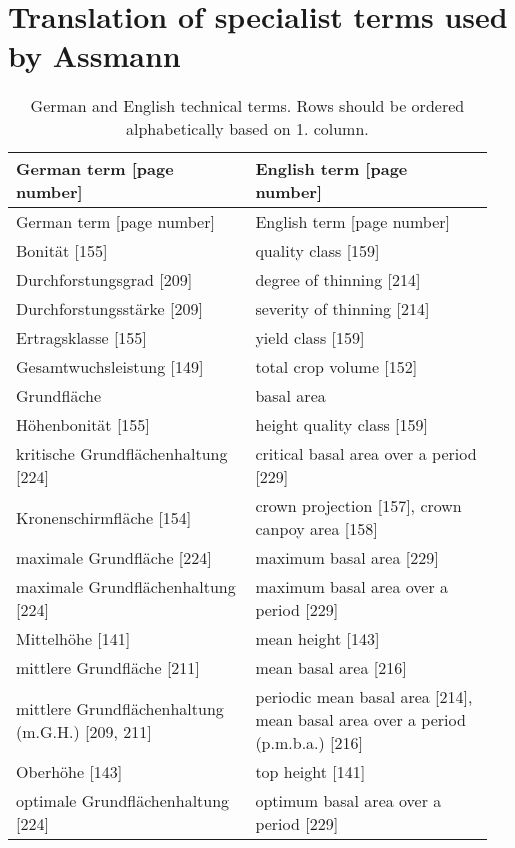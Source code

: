 \section{Translation of specialist terms used by Assmann}

\begin{singlespace}
  {\tabulinesep=2mm
    \begin{longtabu}{p{0.475\linewidth} p{0.475\linewidth}}
      \caption{German \parencite{Assmann1961} and English \parencite{Assmann1970} technical terms.  Rows should be ordered alphabetically based on 1. column.} \\
      \toprule
      German term [page number] & English term [page number] \\
      \midrule
      \endfirsthead
      German term [page number] & English term [page number] \\
      \midrule
      \endhead
      \bottomrule
      \endlastfoot
      Bonität [155] & quality class [159] \\
      Durchforstungsgrad [209] & degree of thinning [214] \\
      Durchforstungsstärke [209] & severity of thinning [214] \\
      Ertragsklasse [155] & yield class [159] \\
      Gesamtwuchsleistung [149] & total crop volume [152] \\
      Grundfläche & basal area \\
      Höhenbonität [155] & height quality class [159] \\
      kritische Grundflächenhaltung [224] & critical basal area over a period [229] \\
      Kronenschirmfläche [154] &  crown projection [157], crown canpoy area [158] \\
      maximale Grundfläche [224] & maximum basal area [229] \\
      maximale Grundflächenhaltung [224] & maximum basal area over a period [229] \\
      Mittelhöhe [141] & mean height [143] \\
      mittlere Grundfläche [211] & mean basal area [216] \\
      mittlere Grundflächenhaltung (m.G.H.) [209, 211] & periodic mean basal area [214], mean basal area over a period (p.m.b.a.) [216] \\
      Oberhöhe [143] & top height [141] \\
      optimale Grundflächenhaltung [224] & optimum basal area over a period [229] \\
      
    \end{longtabu}
  }
\end{singlespace}

